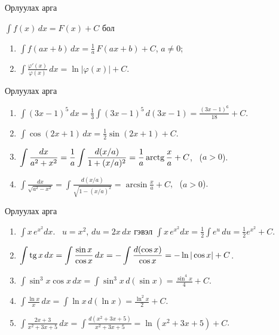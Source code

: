 \begin{frame}[allowframebreaks]{Орлуулах арга}
\begin{cor}
$\displaystyle\int f(x)\,dx=F(x)+C$ бол
\begin{enumerate}
\item $\displaystyle\int f(ax+b)\,dx=\frac1a\,F(ax+b)+C$, \quad $a\ne0$;
\item $\displaystyle\int\frac{\varphi'(x)}{\varphi(x)}\,dx=\ln|\varphi(x)|+C$.
\end{enumerate}
\end{cor}
\end{frame}

\begin{frame}[allowframebreaks]{Орлуулах арга}
\begin{example}
\begin{enumerate}
\item $\displaystyle\int(3x-1)^5\,dx=\frac13\int(3x-1)^5\,d(3x-1)=\frac{(3x-1)^6}{18}+C$.
\item $\displaystyle\int\cos(2x+1)\,dx=\frac12\sin(2x+1)+C$.
\item $\displaystyle\int\frac{dx}{a^2+x^2}=\frac1a\int\frac{d(x/a)}{1+(x/a)^2}=\frac1a\operatorname{arctg}\frac xa+C$, \ ($a>0$).
\item $\displaystyle\int\frac{dx}{\sqrt{a^2-x^2}}=\int\frac{d(x/a)}{\sqrt{1-(x/a)^2}}=\arcsin\frac xa+C$, \ ($a>0$).
\end{enumerate}
\end{example}
\end{frame}

\begin{frame}[allowframebreaks]{Орлуулах арга}
\begin{example}
\begin{enumerate}
\item $\displaystyle\int x\,e^{x^2}dx$. \ $u=x^2$, $du=2x\,dx$ гэвэл
$\displaystyle\int x\,e^{x^2}dx=\frac12\int e^u\,du=\frac12e^{x^2}+C$.
\item $\displaystyle\int\operatorname{tg} x\,dx=\int\frac{\sin x}{\cos x}\,dx=-\int\frac{d(\cos x)}{\cos x}=-\ln|\cos x|+C$.
\item $\displaystyle\int\sin^3x\cos x\,dx=\int\sin^3x\,d(\sin x)=\frac{\sin^4x}{4}+C$.
\item $\displaystyle\int\frac{\ln x}{x}\,dx=\int\ln x\,d(\ln x)=\frac{\ln^2x}{2}+C$.
\item $\displaystyle\int\frac{2x+3}{x^2+3x+5}\,dx=\int\frac{d(x^2+3x+5)}{x^2+3x+5}=\ln(x^2+3x+5)+C$.
\end{enumerate}
\end{example}
\end{frame}


